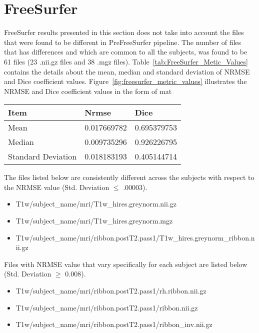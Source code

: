 \section{FreeSurfer} \label{sec:Freesurfer}
FreeSurfer results presented in this section does not take into account the files that were found to be different in PreFreeSurfer pipeline. The number of files that has differences and which are common to all the subjects, was found to be 61 files (23 .nii.gz files and 38 .mgz files). Table~\ref{tab:FreeSurfer_Metic_Values} contains the details about the mean, median and standard deviation of NRMSE and Dice coefficient values. Figure~\ref{fig:freesurfer_metric_values} illustrates the NRMSE and Dice coefficient values in the form of mat
\hfill \break
\begin{center}
\begin{tabular}{|l|l|l|}
\hline
\textbf{Item}      & \textbf{Nrmse} & \textbf{Dice} \\ \hline
Mean               & 0.017669782    & 0.695379753   \\ \hline
Median             & 0.009735296    & 0.926226795   \\ \hline
Standard Deviation & 0.018183193    & 0.405144714   \\ \hline
\end{tabular}
\label{tab:FreeSurfer_Metic_Values}
\end{center}
\hfill \break
The files listed below are consistently different across the subjects with respect to the NRMSE value (Std. Deviation $\leq$ .00003).
\begin{itemize}
\item T1w/subject\_name/mri/T1w\_hires.greynorm.nii.gz
\item T1w/subject\_name/mri/T1w\_hires.greynorm.mgz
\item T1w/subject\_name/mri/ribbon.postT2.pass1/T1w\_hires.greynorm\_ribbon.nii.gz
\end{itemize}

Files with NRMSE value that vary specifically for each subject are listed below (Std. Deviation $\geq$ 0.008).
\begin{itemize}
\item T1w/subject\_name/mri/ribbon.postT2.pass1/rh.ribbon.nii.gz
\item T1w/subject\_name/mri/ribbon.postT2.pass1/ribbon.nii.gz
\item T1w/subject\_name/mri/ribbon.postT2.pass1/ribbon\_inv.nii.gz
\end{itemize}

